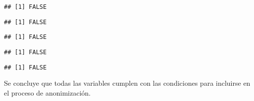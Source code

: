 \documentclass[
]{book}
\newenvironment{Shaded}{\begin{snugshade}}{\end{snugshade}}
\newcommand{\DecValTok}[1]{\textcolor[rgb]{0.00,0.00,0.81}{#1}}
\newcommand{\FunctionTok}[1]{\textcolor[rgb]{0.00,0.00,0.00}{#1}}
\newcommand{\NormalTok}[1]{#1}
\newcommand{\SpecialCharTok}[1]{\textcolor[rgb]{0.00,0.00,0.00}{#1}}
\theoremstyle{definition}
\theoremstyle{definition}
\theoremstyle{definition}
\theoremstyle{definition}
\theoremstyle{remark}
\begin{document}
\begin{verbatim}
## [1] FALSE
\end{verbatim}

\begin{Shaded}
\end{Shaded}

\begin{verbatim}
## [1] FALSE
\end{verbatim}

\begin{Shaded}
\end{Shaded}

\begin{verbatim}
## [1] FALSE
\end{verbatim}

\begin{Shaded}
\end{Shaded}

\begin{verbatim}
## [1] FALSE
\end{verbatim}

\begin{Shaded}
\end{Shaded}

\begin{verbatim}
## [1] FALSE
\end{verbatim}

Se concluye que todas las variables cumplen con las condiciones para incluirse en el proceso de anonimización.
\end{document}

